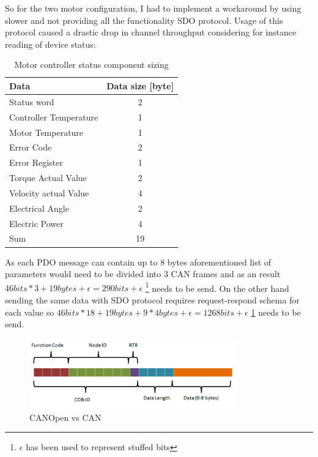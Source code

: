 So for the two motor configuration, I had to implement a workaround by using slower and not providing all the functionality SDO protocol.
Usage of this protocol caused a drastic drop in channel throughput considering for instance reading of device status:
\begin{table}[H]
\centering
\begin{tabular}{|l|c|}
    \hline
    Data & Data size [byte] \\
    \hline
    Status word & 2 \\
    Controller Temperature & 1 \\
    Motor Temperature & 1 \\
    Error Code & 2  \\
    Error Register & 1 \\
    Torque Actual Value & 2  \\
    Velocity actual Value & 4  \\
    Electrical Angle & 2  \\
    Electric Power & 4 \\
    \hline
    \hfill Sum & 19 \\
    \hline
\end{tabular}
\caption{Motor controller status component sizing}
\end{table}

As each PDO message can contain up to 8 bytes aforementioned list of parameters would need to be divided into 3 CAN frames and as an result $46bits*3+19bytes+\epsilon = 290 bits +\epsilon$  \hspace{0.2cm}\footnote{\label{foot:eps}$\epsilon$ has been used to represent stuffed bits} needs to be send. On the other hand sending the same data with SDO protocol requires request-respond schema for each value so $46bits*18 + 19bytes + 9*4bytes + \epsilon = 1268 bits + \epsilon$ \hspace{0.2cm} \ref{foot:eps} needs to be send.

\begin{figure}[H]
    \centering
    \includegraphics[width=0.8\textwidth]{figures/CANOpen vs CAN.png}
    \caption{CANOpen vs CAN}
    \label{fig:canopen_bitwise}
\end{figure}

